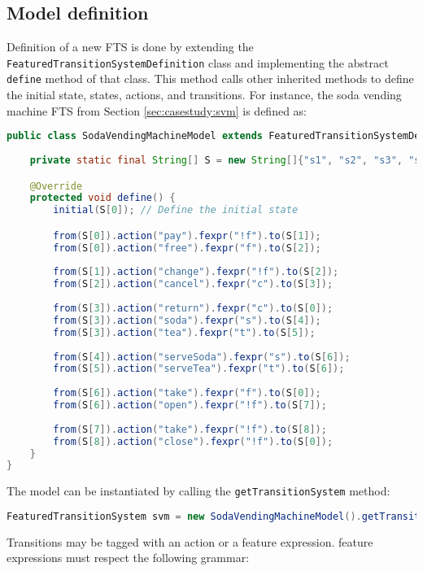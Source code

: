 \subsection{Model definition}

Definition of a new \gls{FTS} is done by extending the \texttt{Featured\-Tran\-si\-tion\-Sys\-tem\-De\-fi\-ni\-tion} class  and implementing the abstract \texttt{define} method of that class. This method calls other inherited methods to define the initial state, states, actions, and transitions. For instance, the \gls{soda vending machine} \gls{FTS} from Section \ref{sec:casestudy:svm} is defined as:
%
\begin{lstlisting}[language=Java,frame=single,numbers=none]
public class SodaVendingMachineModel extends FeaturedTransitionSystemDefinition{
    
    private static final String[] S = new String[]{"s1", "s2", "s3", "s4", "s5", "s6", "s7", "s8", "s9"};

    @Override
    protected void define() {
        initial(S[0]); // Define the initial state

        from(S[0]).action("pay").fexpr("!f").to(S[1]);
        from(S[0]).action("free").fexpr("f").to(S[2]);
        
        from(S[1]).action("change").fexpr("!f").to(S[2]);
        from(S[2]).action("cancel").fexpr("c").to(S[3]);
        
        from(S[3]).action("return").fexpr("c").to(S[0]);
        from(S[3]).action("soda").fexpr("s").to(S[4]);
        from(S[3]).action("tea").fexpr("t").to(S[5]);
        
        from(S[4]).action("serveSoda").fexpr("s").to(S[6]);
        from(S[5]).action("serveTea").fexpr("t").to(S[6]);
        
        from(S[6]).action("take").fexpr("f").to(S[0]);
        from(S[6]).action("open").fexpr("!f").to(S[7]);
        
        from(S[7]).action("take").fexpr("!f").to(S[8]);
        from(S[8]).action("close").fexpr("!f").to(S[0]);
    }   
}
\end{lstlisting}
%
The model can be instantiated by calling the \texttt{getTransitionSystem} method:
%
\begin{lstlisting}[language=Java,frame=single,numbers=none]
FeaturedTransitionSystem svm = new SodaVendingMachineModel().getTransitionSystem();
\end{lstlisting}
%
Transitions may be tagged with an action or a feature expression. \Glspl{feature expression} must respect the following grammar:
